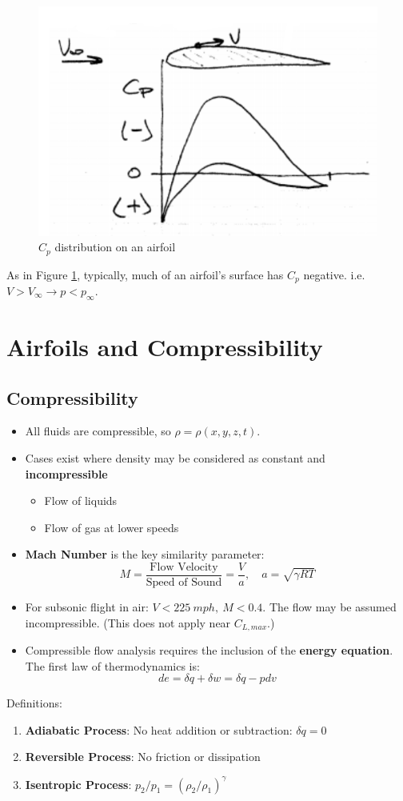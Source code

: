 \documentclass[draft=false, titlepage]{article}
\begin{document}
\begin{figure}[ht]
	\centering
	\includegraphics[width=0.4\linewidth]{Figures/p43_CpOnAirfoil.PNG}
	\caption{$C_p$ distribution on an airfoil}
	\label{fig:p43_CpOnAirfoil}
\end{figure}

As in Figure \ref{fig:p43_CpOnAirfoil}, typically, much of an airfoil's surface has $C_p$ negative. i.e. $V > V_\infty \rightarrow p < p_\infty$.

\section{Airfoils and Compressibility}
\subsection{Compressibility}
\begin{itemize}
	\item All fluids are compressible, so $\rho = \rho(x,y,z,t)$.
	\item Cases exist where density may be considered as constant and \textbf{incompressible}
	\begin{itemize}
		\item Flow of liquids
		\item Flow of gas at lower speeds
	\end{itemize}
	\item \textbf{Mach Number} is the key similarity parameter:
	\begin{equation*}
	M = \frac{\text{Flow Velocity}}{\text{Speed of Sound}} = \frac{V}{a},\quad a = \sqrt{\gamma RT}
	\end{equation*}
	\item For subsonic flight in air: $V < 225\ mph,\ M < 0.4$. The flow may be assumed incompressible. (This does not apply near $C_{L,max}$.)
	\item Compressible flow analysis requires the inclusion of the \textbf{energy equation}.\\
	The first law of thermodynamics is:
	\begin{equation*}
	de = \delta q + \delta w = \delta q - pdv
	\end{equation*}
\end{itemize}
Definitions:
\begin{enumerate}
	\item \textbf{Adiabatic Process}: No heat addition or subtraction: $\delta q = 0$
	\item \textbf{Reversible Process}: No friction or dissipation
	\item \textbf{Isentropic Process}: $\boxed{p_2/p_1 = (\rho_2/\rho_1)^\gamma}$
\end{enumerate}
\end{document}
